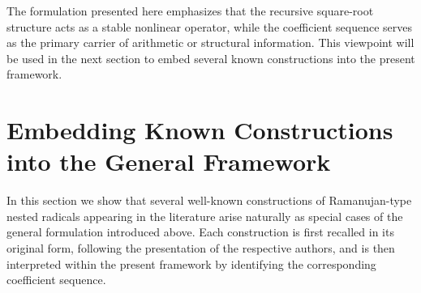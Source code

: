 \documentclass[11pt,a4paper]{amsart}
\theoremstyle{plain}
\theoremstyle{definition}
\theoremstyle{remark}
\begin{document}
The formulation presented here emphasizes that the recursive square-root structure acts as a stable nonlinear operator, while the coefficient sequence serves as the primary carrier of arithmetic or structural information. This viewpoint will be used in the next section to embed several known constructions into the present framework.

\section{Embedding Known Constructions into the General Framework}
\label{sec:embedding}

In this section we show that several well-known constructions of Ramanujan-type nested radicals appearing in the literature arise naturally as special cases of the general formulation introduced above. Each construction is first recalled in its original form, following the presentation of the respective authors, and is then interpreted within the present framework by identifying the corresponding coefficient sequence.
\end{document}

